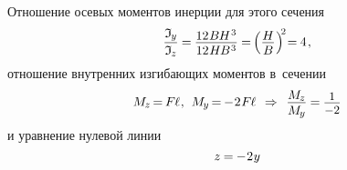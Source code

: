 \documentclass[14pt]{extarticle}
\begin{document}
Отношение осевых моментов инерции для этого сечения
\[
\displaystyle\frac{\mathfrak{I}_{\hspace{-0.1ex}\scalebox{.8}{$y$}}}{\mathfrak{I}_{\hspace{-0.1ex}\scalebox{.8}{$z$}}} \hspace{-.1ex}
= \hspace{-.1ex}
\displaystyle\frac{\raisebox{-0.18em}{$12 \hspace{.1ex} B \hspace{-0.1ex} H^{\hspace{.1ex}3}$}}{12 \hspace{.1ex} H \hspace{-0.15ex} B^{\hspace{.1ex}3}} \hspace{-.1ex}
= \hspace{-.25ex}
\left( \displaystyle\frac{\raisebox{-0.18em}{$H$}}{B} \hspace{.1ex} \right)^{\hspace{-.5ex}2} \hspace{-.5ex}
=\hspace{-.1ex} 4
\hspace{.2ex} ,
\]
отношение внутренних изгибающих моментов в~сечении
\[
M_{\hspace{-0.1ex}\scalebox{.8}{$z$}} \hspace{-.25ex}
= \hspace{-.2ex} F \hspace{-0.1ex} \ell
\hspace{.1ex} , \hspace{.4em}
M_{\hspace{-0.1ex}\scalebox{.8}{$y$}} \hspace{-.25ex}
= \hspace{-.2ex} - \hspace{.1ex} 2 \hspace{.1ex} F \hspace{-0.1ex} \ell
\hspace{.4em} \Rightarrow \hspace{.4em}
\displaystyle\frac{\raisebox{-0.12em}{$M_{\hspace{-0.1ex}\scalebox{.8}{$z$}}$}}{M_{\hspace{-0.1ex}\scalebox{.8}{$y$}}} \hspace{-.1ex}
= \hspace{-.1ex} \scalebox{.93}{$\displaystyle\frac{\raisebox{-0.18em}{$1$}}{-2}$}
\]
и уравнение нулевой линии
\[
z \hspace{-.1ex}=\hspace{-.1ex}
- \hspace{.1ex} 2 \hspace{.1ex} y
\]
\end{document}
